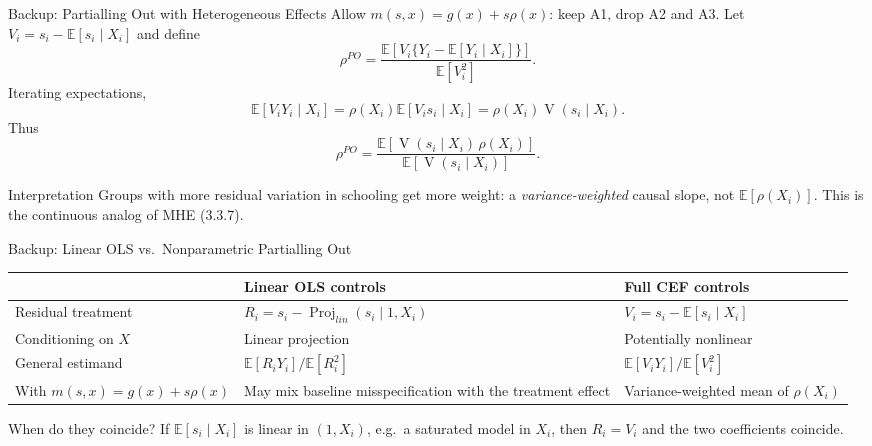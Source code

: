 \documentclass[aspectratio=169,11pt]{beamer}
\newcommand{\E}{\mathbb{E}}
\newcommand{\Var}{\operatorname{V}}
\begin{document}
\begin{frame}{Backup: Partialling Out with Heterogeneous Effects}
\small
Allow $m(s,x)=g(x)+s\rho(x)$: keep A1, drop A2 and A3.
Let $V_i=s_i-\E[s_i\mid X_i]$ and define
\[
\rho^{PO}=\frac{\E[V_i\{Y_i-\E[Y_i\mid X_i]\}]}{\E[V_i^2]}.
\]
Iterating expectations,
\[
\E[V_iY_i\mid X_i]=\rho(X_i)\E[V_i s_i\mid X_i]
=\rho(X_i)\Var(s_i\mid X_i).
\]
Thus
\[
\boxed{\rho^{PO}=
\frac{\E[\Var(s_i\mid X_i)\,\rho(X_i)]}
{\E[\Var(s_i\mid X_i)]}.}
\]
\begin{block}{Interpretation}
Groups with more residual variation in schooling get more weight: a \emph{variance-weighted} causal slope, not $\E[\rho(X_i)]$.
This is the continuous analog of MHE (3.3.7).
\end{block}
\end{frame}

\begin{frame}{Backup: Linear OLS vs.\ Nonparametric Partialling Out}
\small
\renewcommand{\arraystretch}{1.24}
\begin{tabular}{@{}L{3.05cm}L{4.4cm}L{4.45cm}@{}}
\toprule
& \textbf{Linear OLS controls} & \textbf{Full CEF controls}\\
\midrule
Residual treatment & $R_i=s_i-\operatorname{Proj}_{lin}(s_i\mid1,X_i)$ & $V_i=s_i-\E[s_i\mid X_i]$\\
Conditioning on $X$ & Linear projection & Potentially nonlinear\\
General estimand & $\E[R_iY_i]/\E[R_i^2]$ & $\E[V_iY_i]/\E[V_i^2]$\\
With $m(s,x)=g(x)+s\rho(x)$ & May mix baseline misspecification with the treatment effect & Variance-weighted mean of $\rho(X_i)$\\
\bottomrule
\end{tabular}
\medskip
\begin{block}{When do they coincide?}
If $\E[s_i\mid X_i]$ is linear in $(1,X_i)$, e.g.\ a saturated model in $X_i$, then $R_i=V_i$ and the two coefficients coincide.
\end{block}
\end{frame}
\end{document}
